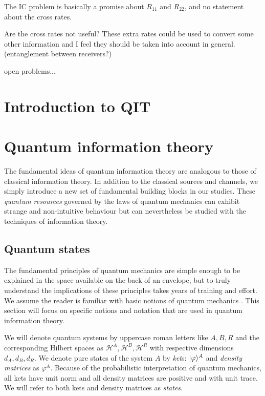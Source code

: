 \documentclass[aps,11pt,twoside,letterpaper]{article}
\def\ph{\varphi}
\def\cH{\mathcal{H}}
\theoremstyle{plain}
\theoremstyle{definition}
\begin{document}
        The IC problem is basically a promise about $R_{11}$ and $R_{22}$,
        and no statement about the cross rates.
        
        Are the cross rates not useful? 
        These extra rates could be used to convert some other information 
        and I feel they should be taken into account in general.
        (entanglement between receivers?)



    open problems...



\appendix


\section{Introduction to QIT}

	\section{Quantum information theory}
	
		The fundamental ideas of quantum information theory are analogous to those of classical information theory. 
		In addition to the classical sources and channels, we simply introduce a new set of fundamental 
		building blocks in our studies.
		These \emph{quantum resources} governed by the laws of quantum mechanics can exhibit strange and non-intuitive
		behaviour but can nevertheless be studied with the techniques of information theory.
		

		\bigskip
		\subsection{Quantum states}
			
			The fundamental principles of quantum mechanics are simple enough to be explained in the space
			available on the back of an envelope, but to truly understand the implications of these
			principles takes years of training and effort.
			We assume the reader is familiar with basic notions of quantum mechanics \cite{sakurai,NC04}. 
			This section will focus on specific notions and notation that are used in quantum information theory.
			
			We will denote quantum systems by uppercase roman letters like $A,B,R$ and the corresponding 
			Hilbert spaces as $\cH^A, \cH^B, \cH^R$ with respective dimensions $d_A,d_B,d_R$.
		    We denote pure states of the system $A$ by \emph{ket}s: $\ket{\ph}^A$
		    and \emph{density matrices} as $\ph^A$.		%
			Because of the probabilistic interpretation of quantum mechanics, all kets have unit norm and all
			density matrices are positive and with unit trace.
		    We will refer to both kets and density matrices as \emph{states}.
		    
\end{document}
